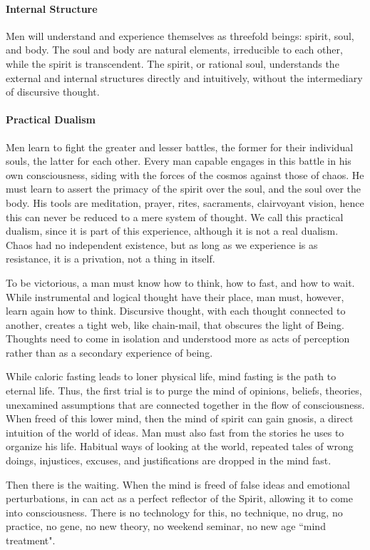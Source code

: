 \paragraph{Internal Structure}
Men will understand and experience themselves as threefold beings: spirit, soul, and body. The soul and body are natural elements, irreducible to each other, while the spirit is transcendent. The spirit, or rational soul, understands the external and internal structures directly and intuitively, without the intermediary of discursive thought.

\paragraph{Practical Dualism}
Men learn to fight the greater and lesser battles, the former for their individual souls, the latter for each other. Every man capable engages in this battle in his own consciousness, siding with the forces of the cosmos against those of chaos. He must learn to assert the primacy of the spirit over the soul, and the soul over the body. His tools are meditation, prayer, rites, sacraments, clairvoyant vision, hence this can never be reduced to a mere system of thought. We call this practical dualism, since it is part of this experience, although it is not a real dualism. Chaos had no independent existence, but as long as we experience is as resistance, it is a privation, not a thing in itself.

To be victorious, a man must know how to think, how to fast, and how to wait. While instrumental and logical thought have their place, man must, however, learn again how to think. Discursive thought, with each thought connected to another, creates a tight web, like chain-mail, that obscures the light of Being. Thoughts need to come in isolation and understood more as acts of perception rather than as a secondary experience of being.

While caloric fasting leads to loner physical life, mind fasting is the path to eternal life. Thus, the first trial is to purge the mind of opinions, beliefs, theories, unexamined assumptions that are connected together in the flow of consciousness. When freed of this lower mind, then the mind of spirit can gain gnosis, a direct intuition of the world of ideas. Man must also fast from the stories he uses to organize his life. Habitual ways of looking at the world, repeated tales of wrong doings, injustices, excuses, and justifications are dropped in the mind fast.

Then there is the waiting. When the mind is freed of false ideas and emotional perturbations, in can act as a perfect reflector of the Spirit, allowing it to come into consciousness. There is no technology for this, no technique, no drug, no practice, no gene, no new theory, no weekend seminar, no new age ``mind treatment".


